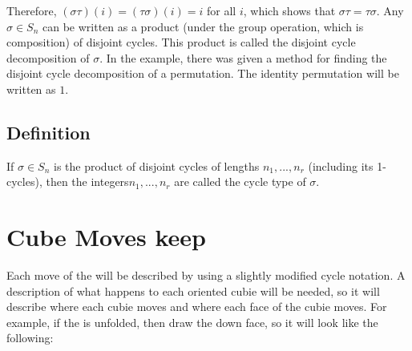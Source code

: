 Therefore, $(\sigma \tau)(i) = (\tau \sigma)(i) = i$ for all $i$, which shows that $\sigma \tau= \tau \sigma$.
Any $\sigma \in S_n$ can be written as a product (under the group operation, which is composition) of disjoint cycles.
This product is called the disjoint cycle decomposition of $\sigma.$ In the example, there was given a method for finding
the disjoint cycle decomposition of a permutation.
The identity permutation will be written as $1$.

\subsection{Definition}

 If $\sigma \in S_n$ is the product of disjoint cycles of lengths $n_1, . . . , n_r$ (including its 1-cycles),
then the integers$ n_1, . . . , n_r$ are called the cycle type of $\sigma$.
\pagebreak{}

\section{Cube Moves keep}

Each move of the \rubik{} will be described by using a slightly modified cycle notation. A description of what happens to each oriented cubie will be needed, so it will describe where each cubie moves and where each face of the cubie moves. For example, if the \rubik{} is unfolded, then draw the down face, so it will look like the following:


